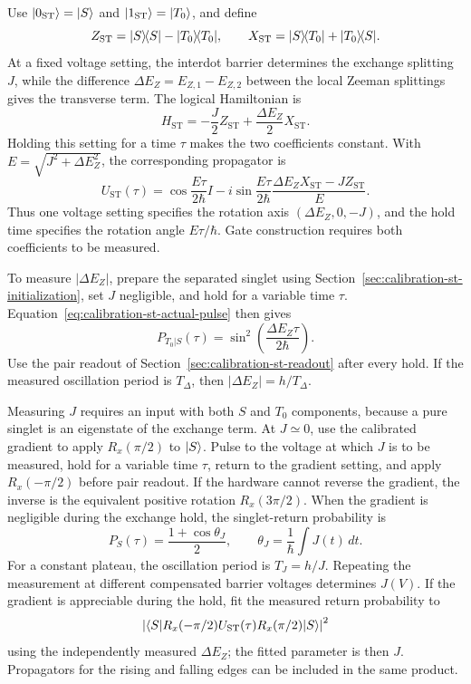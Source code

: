 Use $\lvert 0_{\mathrm{ST}}\rangle=\lvert S\rangle$ and
$\lvert 1_{\mathrm{ST}}\rangle=\lvert T_0\rangle$, and define
\[
 Z_{\mathrm{ST}}=\lvert S\rangle\!\langle S\rvert-\lvert T_0\rangle\!\langle T_0\rvert,
 \qquad
 X_{\mathrm{ST}}=\lvert S\rangle\!\langle T_0\rvert+\lvert T_0\rangle\!\langle S\rvert.
\]
At a fixed voltage setting, the interdot barrier determines the
exchange splitting $J$, while the difference
$\Delta E_Z=E_{Z,1}-E_{Z,2}$ between the local Zeeman splittings
gives the transverse term. The logical Hamiltonian is
\begin{equation}
 H_{\mathrm{ST}}
 =-\frac{J}{2}Z_{\mathrm{ST}}
  +\frac{\Delta E_Z}{2}X_{\mathrm{ST}}.
 \label{eq:calibration-st-axis}
\end{equation}
Holding this setting for a time $\tau$ makes the two coefficients
constant. With $E=\sqrt{J^2+\Delta E_Z^2}$, the corresponding
propagator is
\begin{equation}
 U_{\mathrm{ST}}(\tau)
 =\cos\frac{E\tau}{2\hbar}I
  -i\sin\frac{E\tau}{2\hbar}
       \frac{\Delta E_ZX_{\mathrm{ST}}-JZ_{\mathrm{ST}}}{E}.
 \label{eq:calibration-st-actual-pulse}
\end{equation}
Thus one voltage setting specifies the rotation axis
$(\Delta E_Z,0,-J)$, and the hold time specifies the rotation
angle $E\tau/\hbar$. Gate construction requires both coefficients
to be measured.

To measure $|\Delta E_Z|$, prepare the separated singlet using
Section~\ref{sec:calibration-st-initialization}, set $J$ negligible,
and hold for a variable time $\tau$. Equation~\eqref{eq:calibration-st-actual-pulse}
then gives
\begin{equation}
 P_{T_0|S}(\tau)
 =\sin^2\!\left(\frac{\Delta E_Z\tau}{2\hbar}\right).
 \label{eq:calibration-st-gradient-oscillation}
\end{equation}
Use the pair readout of Section~\ref{sec:calibration-st-readout}
after every hold. If the measured oscillation period is $T_\Delta$,
then $|\Delta E_Z|=h/T_\Delta$.

Measuring $J$ requires an input with both $S$ and $T_0$ components,
because a pure singlet is an eigenstate of the exchange term. At
$J\simeq0$, use the calibrated gradient to apply
$R_x(\pi/2)$ to $\lvert S\rangle$. Pulse to the voltage at which $J$ is to
be measured, hold for a variable time $\tau$, return to the
gradient setting, and apply $R_x(-\pi/2)$ before pair readout. If
the hardware cannot reverse the gradient, the inverse is the
equivalent positive rotation $R_x(3\pi/2)$. When the gradient is
negligible during the exchange hold, the singlet-return probability
is
\begin{equation}
 P_S(\tau)=\frac{1+\cos\theta_J}{2},
 \qquad
 \theta_J=\frac1\hbar\int J(t)\,dt.
 \label{eq:measurement-st-exchange-interference}
\end{equation}
For a constant plateau, the oscillation period is $T_J=h/J$.
Repeating the measurement at different compensated barrier voltages
determines $J(V)$. If the gradient is appreciable during the hold,
fit the measured return probability to
\[
 \left|\langle S\rvert R_x(-\pi/2)
 U_{\mathrm{ST}}(\tau)R_x(\pi/2)\lvert S\rangle\right|^2
\]
using the independently measured $\Delta E_Z$; the fitted parameter
is then $J$. Propagators for the rising and falling edges can be
included in the same product.

